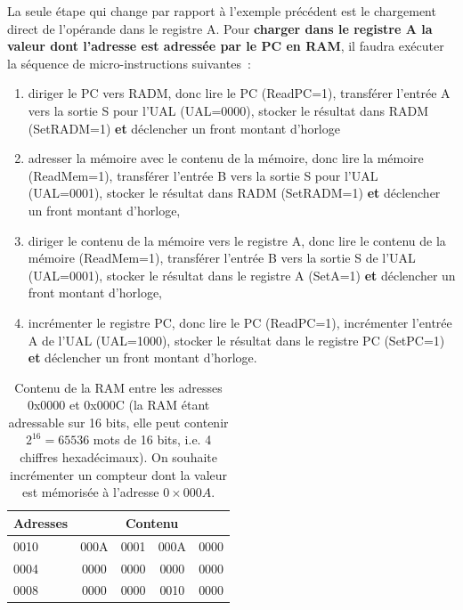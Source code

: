 La seule étape qui change par rapport à l'exemple précédent est le chargement direct de l'opérande dans le registre A. Pour \textbf{charger dans le registre A la valeur dont l'adresse est adressée par le PC en RAM}, il faudra exécuter la séquence de micro-instructions suivantes~:
\begin{enumerate}
\item diriger le PC vers RADM, donc lire le PC (ReadPC=1), transférer l'entrée A vers la sortie S pour l'UAL (UAL=0000), stocker le résultat dans RADM (SetRADM=1) \textbf{et} déclencher un front montant d'horloge
\item adresser la mémoire avec le contenu de la mémoire, donc lire la mémoire (ReadMem=1), transférer l'entrée B vers la sortie S pour l'UAL (UAL=0001), stocker le résultat dans RADM (SetRADM=1) \textbf{et} déclencher un front montant d'horloge,
\item diriger le contenu de la mémoire vers le registre A, donc lire le contenu de la mémoire (ReadMem=1), transférer l'entrée B vers la sortie S de l'UAL (UAL=0001), stocker le résultat dans le registre A (SetA=1) \textbf{et} déclencher un front montant d'horloge,
\item incrémenter le registre PC, donc lire le PC (ReadPC=1), incrémenter l’entrée A de l'UAL (UAL=1000), stocker le résultat dans le registre PC (SetPC=1) \textbf{et} déclencher un front montant d’horloge.
\end{enumerate}

\begin{table}[htbp]
\centering\begin{tabular}{l|cccc}
Adresses & \multicolumn{4}{c}{Contenu}\\
\hline
0010 & 000A & 0001 & 000A & 0000\\
0004 & 0000 & 0000 & 0000 & 0000\\
0008 & 0000 & 0000 & 0010 & 0000
\end{tabular}
\caption{\label{fig:ram_content2} Contenu de la RAM entre les adresses 0x0000 et 0x000C (la RAM étant adressable sur 16 bits, elle peut contenir $2^{16} = 65536$ mots de 16 bits, i.e. 4 chiffres hexadécimaux). On souhaite incrémenter un compteur dont la valeur est mémorisée à l'adresse $0\times000A$.}
\end{table}
